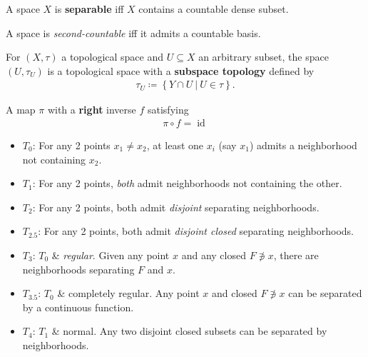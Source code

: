 \begin{definition}

A space \(X\) is \textbf{separable} iff \(X\) contains a countable dense
subset.

\end{definition}

\begin{definition}

A space is \emph{second-countable} iff it admits a countable basis.

\end{definition}

\begin{definition}

For \((X, \tau)\) a topological space and \(U \subseteq X\) an arbitrary
subset, the space \((U, \tau_U)\) is a topological space with a
\textbf{subspace topology} defined by
\begin{align*}
\tau_U \coloneqq\left\{{Y \cap U {~\mathrel{\Big|}~}U \in \tau}\right\}
.\end{align*}

\end{definition}

\begin{definition}[Surjection]

A map \(\pi\) with a \textbf{right} inverse \(f\) satisfying
\begin{align*}\pi \circ f = \operatorname{id}\end{align*}

\end{definition}

\begin{definition}

\envlist

\begin{itemize}
\item
  \(T_0\): For any 2 points \(x_1\neq x_2\), at least one \(x_i\) (say
  \(x_1\)) admits a neighborhood not containing \(x_2\).
\item
  \(T_1\): For any 2 points, \emph{both} admit neighborhoods not
  containing the other.
\item
  \(T_2\): For any 2 points, both admit \emph{disjoint} separating
  neighborhoods.
\item
  \(T_{2.5}\): For any 2 points, both admit \emph{disjoint closed}
  separating neighborhoods.
\item
  \(T_3\): \(T_0\) \& \emph{regular}. Given any point \(x\) and any
  closed \(F\not\ni x\), there are neighborhoods separating \(F\) and
  \(x\).
\item
  \(T_{3.5}\): \(T_0\) \& completely regular. Any point \(x\) and closed
  \(F\not\ni x\) can be separated by a continuous function.
\item
  \(T_4\): \(T_1\) \& normal. Any two disjoint closed subsets can be
  separated by neighborhoods.
\end{itemize}

\end{definition}

